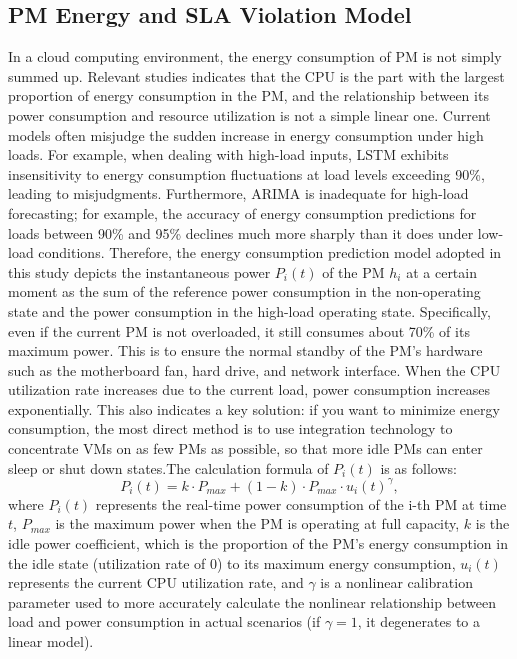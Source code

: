 \documentclass[conference]{{IEEEtran}}
\begin{document}
\subsection{PM Energy and SLA Violation Model}

In a cloud computing environment, the energy consumption of PM is not simply summed up. Relevant studies indicates\cite{torquato2025evaluation} that the CPU is the part with the largest proportion of energy consumption in the PM, and the relationship between its power consumption and resource utilization is not a simple linear one. Current models often misjudge the sudden increase in energy consumption under high loads. For example, when dealing with high-load inputs, LSTM exhibits insensitivity to energy consumption fluctuations at load levels exceeding 90\%, leading to misjudgments. Furthermore, ARIMA is inadequate for high-load forecasting; for example, the accuracy of energy consumption predictions for loads between 90\% and 95\% declines much more sharply than it does under low-load conditions. Therefore, the energy consumption prediction model adopted in this study depicts the instantaneous power $P_i(t)$ of the PM $h_{i}$ at a certain moment as the sum of the reference power consumption in the non-operating state and the power consumption in the high-load operating state. Specifically, even if the current PM is not overloaded, it still consumes about 70\% of its maximum power. This is to ensure the normal standby of the PM's hardware such as the motherboard fan, hard drive, and network interface. When the CPU utilization rate increases due to the current load, power consumption  increases exponentially\cite{cui2024energy}. This also indicates a key solution: if you want to minimize energy consumption, the most direct method is to use integration technology to concentrate VMs on as few PMs as possible, so that more idle PMs can enter sleep or shut down states.The calculation formula of  $P_i(t)$ is as follows:\begin{equation}
    P_i(t) = k \cdot P_{max} + (1-k) \cdot P_{max} \cdot u_i(t)^\gamma,
\label{eq:power_model}
\end{equation}
where $P_i(t)$ represents the real-time power consumption of the i-th PM at time $t$, $P_{max}$ is the maximum power when the PM is operating at full capacity, $k$ is the idle power coefficient, which is the proportion of the PM's energy consumption in the idle state (utilization rate of 0) to its maximum energy consumption, $u_i(t)$ represents the current CPU utilization rate, and $\gamma$ is a nonlinear calibration parameter used to more accurately calculate the nonlinear relationship between load and power consumption in actual scenarios (if $\gamma=1$, it degenerates to a linear model).
\end{document}
